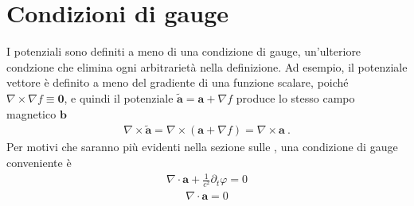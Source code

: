 \documentclass[letterpaper,10pt,italian]{jupyterBook}
\begin{document}
\section{Condizioni di gauge}
\label{\detokenize{ch/potentials:condizioni-di-gauge}}
\sphinxAtStartPar
I potenziali sono definiti a meno di una condizione di gauge, un’ulteriore condzione che elimina ogni arbitrarietà nella definizione.
Ad esempio, il potenziale vettore è definito a meno del gradiente di una funzione scalare, poiché \(\nabla \times \nabla f \equiv \mathbf{0}\), e quindi il potenziale \(\tilde{\mathbf{a}} = \mathbf{a} + \nabla f\) produce lo stesso campo magnetico \(\mathbf{b}\)
\begin{equation*}
\begin{split}\nabla \times \tilde{\mathbf{a}} = \nabla \times (\mathbf{a} + \nabla f) = \nabla \times \mathbf{a} \ .\end{split}
\end{equation*}
\sphinxAtStartPar
{} Per motivi che saranno più evidenti nella sezione sulle {\hyperref[\detokenize{ch/waves:classical-electromagnetism-waves}]{}}, una condizione di gauge conveniente è
\begin{equation*}
\begin{split}\nabla \cdot \mathbf{a} + \frac{1}{c^2} \partial_t \varphi = 0\end{split}
\end{equation*}
\sphinxAtStartPar
{}
\begin{equation*}
\begin{split}\nabla \cdot \mathbf{a} = 0\end{split}
\end{equation*}
\sphinxstepscope
\end{document}
